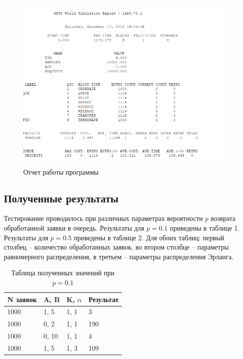 \FloatBarrier
\begin{figure}[h]	
	\begin{center}
		\includegraphics[width=\linewidth]{inc/png/report.png}
	\end{center}
	\captionsetup{justification=centering}
	\caption{Отчет работы программы}
\end{figure}
\FloatBarrier


\subsection*{Полученные результаты}
Тестирование проводилось при различных параметрах вероятности $p$ возврата обработанной заявки в очередь. 
Результаты для $p = 0.1$ приведены в таблице 1.
Результаты для $p = 0.5$ приведены в таблице 2.
Для обоих таблиц: первый столбец -- количество обработанных заявок, во втором столбце -- параметры равномерного распределения, в третьем -- параметры распределения Эрланга.

\FloatBarrier
\begin{table}[h]
	\caption{Таблица полученных значений при $ p = 0.1 $}
	\centering
	\begin{tabular}{ | l | l | l | l |}
		\hline
		N заявок & A, B & K, $\alpha$ & Результат \\
		\hline
		1000 & 1, 5 & 1, 1 & 3 \\
		\hline
		1000 & 0, 2 & 1, 1 & 190  \\
		\hline
		1000 & 0, 10 & 1, 1 & 4  \\
		\hline
		1000 & 1, 5 & 1, 3 & 109 \\
		\hline
	\end{tabular}
\end{table}
\FloatBarrier

